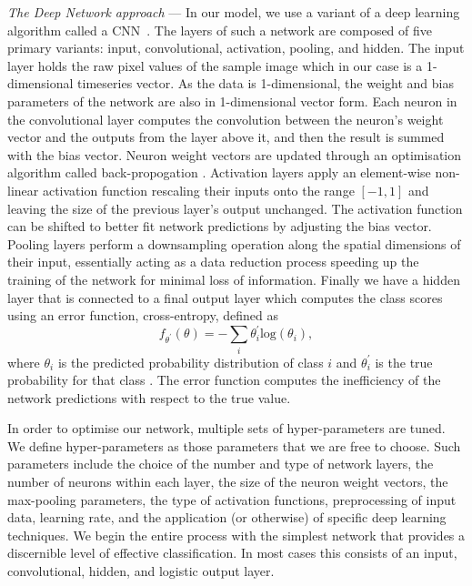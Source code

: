 \documentclass[%
showpacs,
 amsmath,amssymb,
 aps,
 twocolumn,
 prl,
 reprint,
floatfix,
]{revtex4-1}
\begin{document}
%
% 
\textit{The Deep Network approach} --- 
%
%
In our model, we use a variant of a deep learning algorithm called a
\ac{CNN}~\cite{726791}. The layers of such a network are composed of five
primary variants: input, convolutional, activation, pooling, and
hidden. The input layer holds the raw pixel values of the sample
image which in our case is a 1-dimensional timeseries vector. As the data is 1-dimensional, the weight and bias parameters of the network are also in 1-dimensional vector form. Each neuron in the convolutional layer computes the convolution between the neuron's weight vector and the outputs from the layer above it, and then the result is summed with the bias vector. Neuron weight vectors are updated through an optimisation algorithm called back-propogation \cite{LeCun1998}. 
Activation layers apply an element-wise non-linear activation function rescaling
their inputs onto the range $[-1,1]$ and leaving the size of the previous
layer's output unchanged. The activation function can be shifted to better fit network predictions by adjusting the bias vector. 
Pooling layers perform a downsampling operation along
the spatial dimensions of their input, essentially acting as a data reduction
process speeding up the training of the network for minimal loss of
information. Finally we have a hidden layer that is connected to a final output layer which
computes the class scores using an error function, cross-entropy, defined as
%
%
\begin{equation} \label{eq:loss}
f_{\theta^{'}}(\theta) = -\sum_{i} \theta_{i}^{'} \mathrm{log}(\theta_{i}),
\end{equation}
%
where $\theta_{i}$ is the predicted probability distribution of class $i$ and
$\theta_{i}^{'}$ is the true probability for that class
\cite{tensorflow2015-whitepaper}. The error function computes the inefficiency of
the network predictions with respect to the true value. 

%
%
In order to optimise our network, multiple sets of hyper-parameters are
tuned. We define hyper-parameters as those parameters that we are free to
choose. Such parameters include the choice of the number and type of network
layers, the number of neurons within each layer, the size of the neuron weight vectors, the max-pooling
parameters, the type of activation functions, preprocessing of input data,
 learning rate, and the application (or otherwise) of specific deep learning techniques. We begin
the entire process with the simplest network that provides a discernible level
of effective classification. In most cases this consists of an input,
convolutional, hidden, and logistic output layer.
\end{document}
